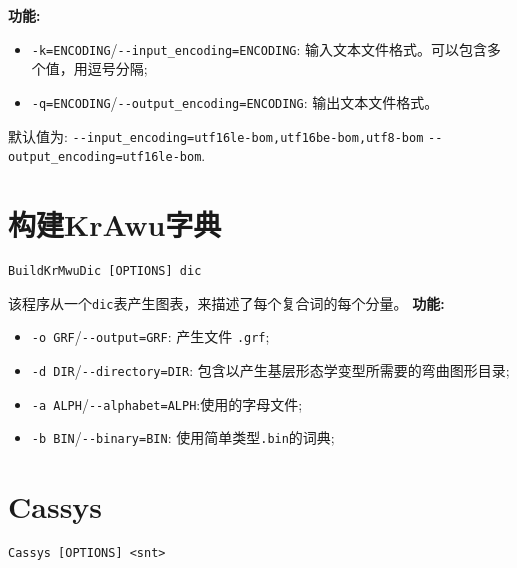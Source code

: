 \bigskip
\noindent \textbf{功能:}
\begin{itemize}
\item \verb+-k=ENCODING+/\verb+--input_encoding=ENCODING+: 输入文本文件格式。可以包含多个值，用逗号分隔;
\item \verb+-q=ENCODING+/\verb+--output_encoding=ENCODING+: 输出文本文件格式。 
\end{itemize}

\noindent 默认值为: \verb+--input_encoding=utf16le-bom,utf16be-bom,utf8-bom+
\newline \verb+--output_encoding=utf16le-bom+.


\section{构建KrAwu字典}
\verb+BuildKrMwuDic [OPTIONS] dic+

\bigskip
\noindent 该程序从一个\verb+dic+表产生图表，来描述了每个复合词的每个分量。
\bigskip
\noindent \textbf{功能:}
\begin{itemize}
\item \verb+-o GRF+/\verb+--output=GRF+: 产生文件 \verb+.grf+;
\item \verb+-d DIR+/\verb+--directory=DIR+: 包含以产生基层形态学变型所需要的弯曲图形目录;
\item \verb+-a ALPH+/\verb+--alphabet=ALPH+:使用的字母文件;
\item \verb+-b BIN+/\verb+--binary=BIN+:  使用简单类型\verb+.bin+的词典;
\end{itemize}






\section{Cassys}
\verb+Cassys [OPTIONS] <snt>+

